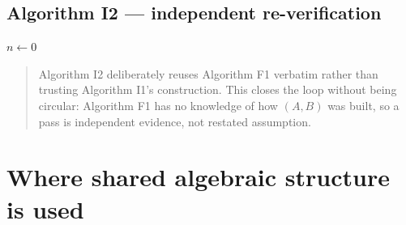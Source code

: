 \documentclass[11pt]{article}
\theoremstyle{plain}
\theoremstyle{definition}
\newenvironment{mynote}{%
  \begin{quotation}\noindent\small
}{%
  \end{quotation}
}
\begin{document}
\subsection{Algorithm I2 --- independent re-verification}

\begin{algorithm}[H]
\caption{Re-verification of the constructed code}
$n\gets 0$\;
\end{algorithm}

\begin{mynote}
Algorithm I2 deliberately reuses Algorithm F1 verbatim rather than trusting
Algorithm I1's construction. This closes the loop without being circular:
Algorithm F1 has no knowledge of how $(A,B)$ was built, so a pass is
independent evidence, not restated assumption.
\end{mynote}

\section{Where shared algebraic structure is used}
\label{sec:shared}
\end{document}
